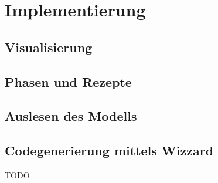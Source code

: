 \chapter{Implementierung} \label{chapter:thevetestcase}
\section{Visualisierung}
\section{Phasen und Rezepte}
\section{Auslesen des Modells}
\section{Codegenerierung mittels Wizzard}

TODO